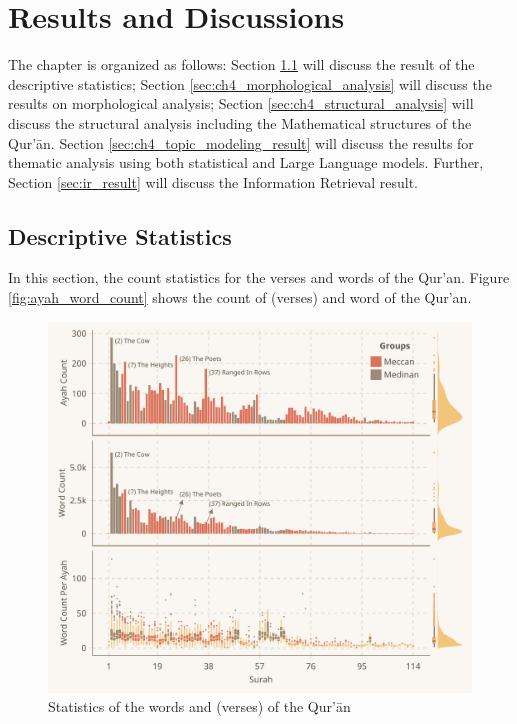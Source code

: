 \chapter{Results and Discussions}
The chapter is organized as follows: Section \ref{sec:ch4_desc_stat} will discuss the result of the descriptive statistics; Section \ref{sec:ch4_morphological_analysis} will discuss the results on morphological analysis; Section \ref{sec:ch4_structural_analysis} will discuss the structural analysis including the Mathematical structures of the Qur'\=an. Section \ref{sec:ch4_topic_modeling_result} will discuss the results for thematic analysis using both statistical and Large Language models. Further, 
Section \ref{sec:ir_result} will discuss the Information Retrieval result.
\section{Descriptive Statistics}\label{sec:ch4_desc_stat}
In this section, the count statistics for the verses and words of the Qur'an. Figure \ref{fig:ayah_word_count} shows the count of   (verses) and word of the Qur'an.

\begin{figure}[!b]
    \centering
    \includegraphics[width=\textwidth]{img/plot1.pdf}
    \caption{Statistics of the words and   (verses) of the Qur'\=an}
    \label{fig:ch4_ayah_word_count}
\end{figure}

